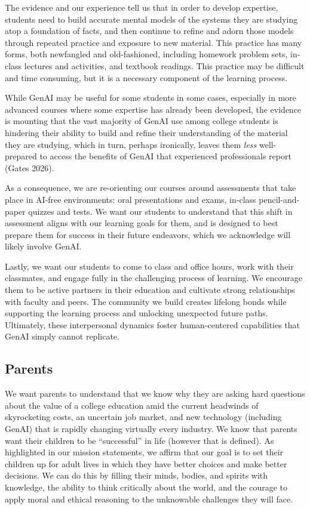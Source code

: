 \documentclass[
]{hdsr}
\begin{document}
The evidence and our experience tell us that in order to develop
expertise, students need to build accurate mental models of the systems
they are studying atop a foundation of facts, and then continue to
refine and adorn those models through repeated practice and exposure to
new material. This practice has many forms, both newfangled and
old-fashioned, including homework problem sets, in-class lectures and
activities, and textbook readings. This practice may be difficult and
time consuming, but it is a necessary component of the learning process.

While GenAI may be useful for some students in some cases, especially in
more advanced courses where some expertise has already been developed,
the evidence is mounting that the vast majority of GenAI use among
college students is hindering their ability to build and refine their
understanding of the material they are studying, which in turn, perhaps
ironically, leaves them \emph{less} well-prepared to access the benefits
of GenAI that experienced professionals report (Gates 2026).

As a consequence, we are re-orienting our courses around assessments
that take place in AI-free environments: oral presentations and exams,
in-class pencil-and-paper quizzes and tests. We want our students to
understand that this shift in assessment aligns with our learning goals
for them, and is designed to best prepare them for success in their
future endeavors, which we acknowledge will likely involve GenAI.

Lastly, we want our students to come to class and office hours, work
with their classmates, and engage fully in the challenging process of
learning. We encourage them to be active partners in their education and
cultivate strong relationships with faculty and peers. The community we
build creates lifelong bonds while supporting the learning process and
unlocking unexpected future paths. Ultimately, these interpersonal
dynamics foster human-centered capabilities that GenAI simply cannot
replicate.

\subsection{Parents}\label{parents}

We want parents to understand that we know why they are asking hard
questions about the value of a college education amid the current
headwinds of skyrocketing costs, an uncertain job market, and new
technology (including GenAI) that is rapidly changing virtually every
industry. We know that parents want their children to be ``successful''
in life (however that is defined). As highlighted in our mission
statements, we affirm that our goal is to set their children up for
adult lives in which they have better choices and make better decisions.
We can do this by filling their minds, bodies, and spirits with
knowledge, the ability to think critically about the world, and the
courage to apply moral and ethical reasoning to the unknowable
challenges they will face.
\end{document}
